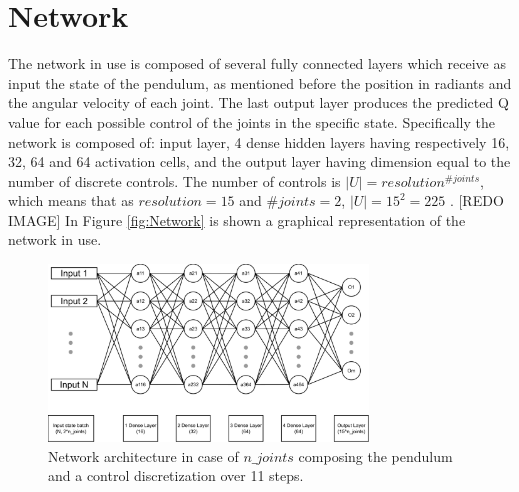 \documentclass[twocolumn, a4paper]{article}
\begin{document}
\section{Network}
The network in use is composed of several fully connected layers which receive
as input the state of the pendulum, as mentioned before the position in
radiants and the angular velocity of each joint.
The last output layer produces the predicted Q value for each possible control
of the joints in the specific state.
Specifically the network is composed of: input layer, 4 dense hidden layers
having respectively 16, 32, 64 and 64 activation cells, and the output layer
having dimension equal to the number of discrete controls.
The number of controls is \(|U|=resolution^{\#joints}\), which
means that as \(resolution=15\) and \(\#joints=2\), \(|U|=15^{2}=225\) .
[REDO IMAGE]
In Figure \ref{fig:Network} is shown a graphical representation of the network
in use.

\label{fig:Network}
\begin{figure}
	\centering
	\includegraphics[width=8.5cm]{"../Figures/Network_schema"}
	\caption{Network architecture in case of $n\_joints$ composing the pendulum
			 and a control discretization over 11 steps.}
\end{figure}
\end{document}
